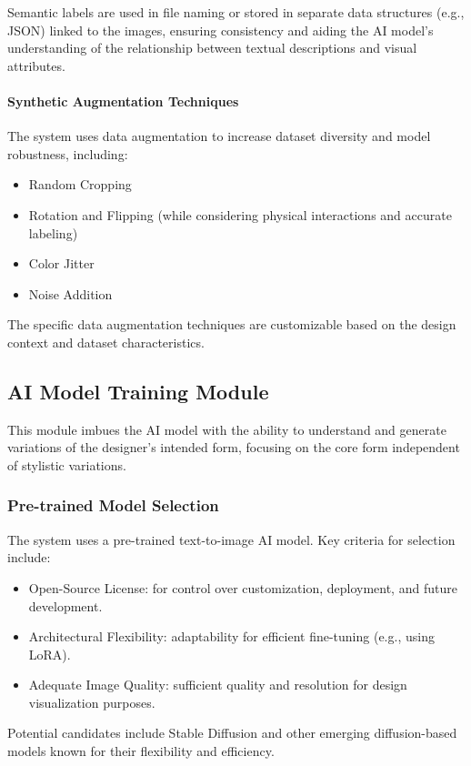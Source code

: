 \documentclass[12pt]{article}
\begin{document}
Semantic labels are used in file naming or stored in separate data structures (e.g., JSON) linked to the images, ensuring consistency and aiding the AI model's understanding of the relationship between textual descriptions and visual attributes.

\paragraph{Synthetic Augmentation Techniques}

The system uses data augmentation to increase dataset diversity and model robustness, including:

\begin{itemize}
    \item Random Cropping
    \item Rotation and Flipping (while considering physical interactions and accurate labeling)
    \item Color Jitter
    \item Noise Addition 
\end{itemize}

The specific data augmentation techniques are customizable based on the design context and dataset characteristics.

\subsection{AI Model Training Module}
This module imbues the AI model with the ability to understand and generate variations of the designer's intended form, focusing on the core form independent of stylistic variations.

\subsubsection{Pre-trained Model Selection}
The system uses a pre-trained text-to-image AI model. Key criteria for selection include:
\begin{itemize}
    \item Open-Source License: for control over customization, deployment, and future development.
    \item Architectural Flexibility: adaptability for efficient fine-tuning (e.g., using LoRA).
    \item Adequate Image Quality: sufficient quality and resolution for design visualization purposes.
\end{itemize}
Potential candidates include Stable Diffusion and other emerging diffusion-based models known for their flexibility and efficiency.
\end{document}
